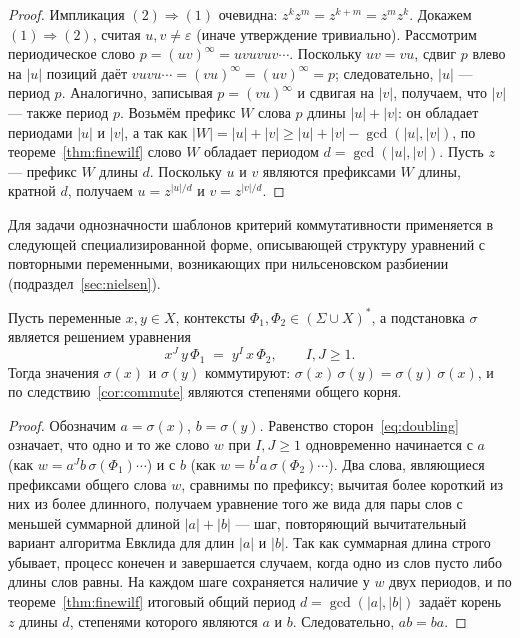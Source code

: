 \documentclass[14pt, russian]{scrartcl}
\begin{document}
\begin{proof}
Импликация $(2) \Rightarrow (1)$ очевидна: $z^k z^m = z^{k+m} = z^m z^k$.
Докажем $(1) \Rightarrow (2)$, считая $u, v \neq \varepsilon$ (иначе утверждение
тривиально). Рассмотрим периодическое слово $p = (uv)^\infty = uvuvuv\cdots$.
Поскольку $uv = vu$, сдвиг $p$ влево на $|u|$ позиций даёт
$vuvu\cdots = (vu)^\infty = (uv)^\infty = p$; следовательно, $|u|$ --- период $p$.
Аналогично, записывая $p = (vu)^\infty$ и сдвигая на $|v|$, получаем, что $|v|$ ---
также период $p$. Возьмём префикс $W$ слова $p$ длины $|u| + |v|$: он обладает
периодами $|u|$ и $|v|$, а так как $|W| = |u| + |v| \ge |u| + |v| - \gcd(|u|,|v|)$,
по теореме~\ref{thm:finewilf} слово $W$ обладает периодом $d = \gcd(|u|, |v|)$.
Пусть $z$ --- префикс $W$ длины $d$. Поскольку $u$ и $v$ являются префиксами $W$
длины, кратной $d$, получаем $u = z^{|u|/d}$ и $v = z^{|v|/d}$.
\end{proof}

Для задачи однозначности шаблонов критерий коммутативности применяется в следующей
специализированной форме, описывающей структуру уравнений с повторными переменными,
возникающих при нильсеновском разбиении (подраздел~\ref{sec:nielsen}).

\begin{Lemma}
\label{lem:doubling}
Пусть переменные $x, y \in X$, контексты $\Phi_1, \Phi_2 \in (\Sigma \cup X)^*$,
а подстановка $\sigma$ является решением уравнения
\begin{equation}
\label{eq:doubling}
x^{J}\, y\, \Phi_1 \;=\; y^{I}\, x\, \Phi_2, \qquad I, J \ge 1.
\end{equation}
Тогда значения $\sigma(x)$ и $\sigma(y)$ коммутируют:
$\sigma(x)\,\sigma(y) = \sigma(y)\,\sigma(x)$, и по следствию~\ref{cor:commute}
являются степенями общего корня.
\end{Lemma}

\begin{proof}
Обозначим $a = \sigma(x)$, $b = \sigma(y)$. Равенство сторон~\eqref{eq:doubling}
означает, что одно и то же слово $w$ при $I, J \ge 1$ одновременно начинается с
$a$ (как $w = a^{J} b\,\sigma(\Phi_1)\cdots$) и с $b$ (как
$w = b^{I} a\,\sigma(\Phi_2)\cdots$). Два слова, являющиеся префиксами общего слова
$w$, сравнимы по префиксу; вычитая более короткий из них из более длинного, получаем
уравнение того же вида для пары слов с меньшей суммарной длиной $|a| + |b|$ ---
шаг, повторяющий вычитательный вариант алгоритма Евклида для длин $|a|$ и $|b|$.
Так как суммарная длина строго убывает, процесс конечен и завершается случаем, когда
одно из слов пусто либо длины слов равны. На каждом шаге сохраняется наличие у $w$
двух периодов, и по теореме~\ref{thm:finewilf} итоговый общий период
$d = \gcd(|a|, |b|)$ задаёт корень $z$ длины $d$, степенями которого являются $a$ и
$b$. Следовательно, $ab = ba$.
\end{proof}
\end{document}
